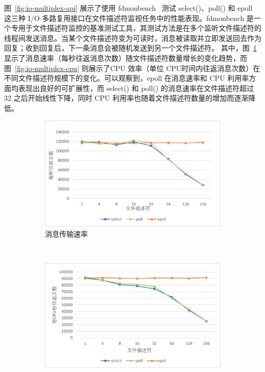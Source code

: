 {\begin{enumerate}[label=\arabic*.]
              图~\ref{fig:io-multiplex-api} 展示了使用 fdmonbench~\citep{githubStefanhafdmonbench} 测试 select()、poll() 和 epoll 这三种 I/O 多路复用接口在文件描述符监视任务中的性能表现。fdmonbench 是一个专用于文件描述符监控的基准测试工具，其测试方法是在多个监听文件描述符的线程间发送消息。当某个文件描述符变为可读时，消息被读取并立即发送回去作为回复；收到回复后，下一条消息会被随机发送到另一个文件描述符。 其中，图~\ref{fig:io-multiplex-perf} 显示了消息速率（每秒往返消息次数）随文件描述符数量增长的变化趋势，而图~\ref{fig:io-multiplex-cpu} 则展示了CPU 效率（单位 CPU时间内往返消息次数）在不同文件描述符规模下的变化。可以观察到，epoll 在消息速率和 CPU 利用率方面均表现出良好的可扩展性，而 select() 和 poll() 的消息速率在文件描述符超过 32 之后开始线性下降，同时 CPU 利用率也随着文件描述符数量的增加而逐渐降低。
              \begin{figure}[!htbp]
                  \centering
                  \begin{subfigure}[b]{0.45\textwidth}
                      \includegraphics[width=\textwidth]{Img/io-multiplex-perf.png}
                      \caption{消息传输速率}
                      \label{fig:io-multiplex-perf}
                  \end{subfigure}
                  ~ %
                  \begin{subfigure}[b]{0.45\textwidth}
                      \includegraphics[width=\textwidth]{Img/io-multiplex-cpu.png}

\end{subfigure}
\end{figure}
\end{enumerate}}
